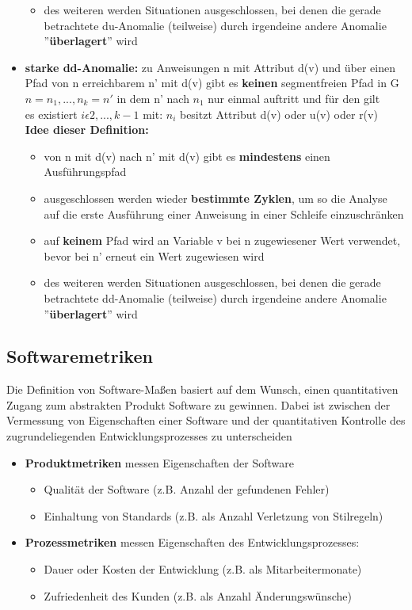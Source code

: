 \begin{itemize}
\begin{itemize}
		\item des weiteren werden Situationen ausgeschlossen, bei denen die gerade betrachtete du-Anomalie (teilweise) durch irgendeine andere Anomalie ''\textbf{überlagert}'' wird
	\end{itemize}
	\item \textbf{starke dd-Anomalie:} zu Anweisungen n mit Attribut d(v) und über einen Pfad von n erreichbarem n' mit d(v) gibt es \textbf{keinen} segmentfreien Pfad in G $n = n_{1}, ... , n_{k} = n'$ in dem n' nach $n_{1}$ nur einmal auftritt und für den gilt \\
	es existiert $i \epsilon 2, ... ,k-1$ mit: $n_{i}$ besitzt Attribut d(v) oder u(v) oder r(v) \\
	\textbf{Idee dieser Definition:}
	\begin{itemize}
		\item von n mit d(v) nach n' mit d(v) gibt es \textbf{mindestens} einen Ausführungspfad
		\item ausgeschlossen werden wieder \textbf{bestimmte Zyklen}, um so die Analyse auf die erste Ausführung einer Anweisung in einer Schleife einzuschränken 
		\item auf \textbf{keinem} Pfad wird an Variable v bei n zugewiesener Wert verwendet, bevor bei n' erneut ein Wert zugewiesen wird
		\item des weiteren werden Situationen ausgeschlossen, bei denen die gerade betrachtete dd-Anomalie (teilweise) durch irgendeine andere Anomalie ''\textbf{überlagert}'' wird
	\end{itemize}
\end{itemize}

\subsection{Softwaremetriken}

Die Definition von Software-Maßen basiert auf dem Wunsch, einen quantitativen Zugang zum abstrakten Produkt Software zu gewinnen. Dabei ist zwischen der Vermessung von Eigenschaften einer Software und der quantitativen Kontrolle des zugrundeliegenden Entwicklungsprozesses zu unterscheiden
\begin{itemize}
	\item \textbf{Produktmetriken} messen Eigenschaften der Software
	\begin{itemize}
		\item Qualität der Software (z.B. Anzahl der gefundenen Fehler)
		\item Einhaltung von Standards (z.B. als Anzahl Verletzung von Stilregeln)
	\end{itemize}
	\item \textbf{Prozessmetriken} messen Eigenschaften des Entwicklungsprozesses:
	\begin{itemize}
		\item Dauer oder Kosten der Entwicklung (z.B. als Mitarbeitermonate)
		\item Zufriedenheit des Kunden (z.B. als Anzahl Änderungswünsche)
	\end{itemize}
\end{itemize}


